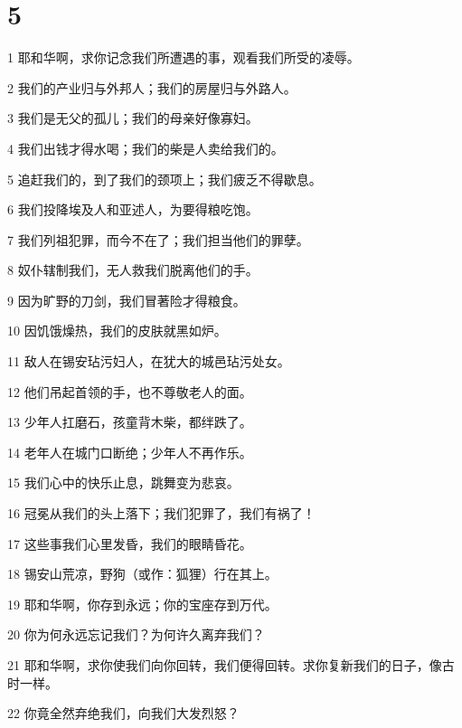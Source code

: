 \chapter{5}

\par 1 耶和华啊，求你记念我们所遭遇的事，观看我们所受的凌辱。
\par 2 我们的产业归与外邦人；我们的房屋归与外路人。
\par 3 我们是无父的孤儿；我们的母亲好像寡妇。
\par 4 我们出钱才得水喝；我们的柴是人卖给我们的。
\par 5 追赶我们的，到了我们的颈项上；我们疲乏不得歇息。
\par 6 我们投降埃及人和亚述人，为要得粮吃饱。
\par 7 我们列祖犯罪，而今不在了；我们担当他们的罪孽。
\par 8 奴仆辖制我们，无人救我们脱离他们的手。
\par 9 因为旷野的刀剑，我们冒著险才得粮食。
\par 10 因饥饿燥热，我们的皮肤就黑如炉。
\par 11 敌人在锡安玷污妇人，在犹大的城邑玷污处女。
\par 12 他们吊起首领的手，也不尊敬老人的面。
\par 13 少年人扛磨石，孩童背木柴，都绊跌了。
\par 14 老年人在城门口断绝；少年人不再作乐。
\par 15 我们心中的快乐止息，跳舞变为悲哀。
\par 16 冠冕从我们的头上落下；我们犯罪了，我们有祸了！
\par 17 这些事我们心里发昏，我们的眼睛昏花。
\par 18 锡安山荒凉，野狗（或作：狐狸）行在其上。
\par 19 耶和华啊，你存到永远；你的宝座存到万代。
\par 20 你为何永远忘记我们？为何许久离弃我们？
\par 21 耶和华啊，求你使我们向你回转，我们便得回转。求你复新我们的日子，像古时一样。
\par 22 你竟全然弃绝我们，向我们大发烈怒？


